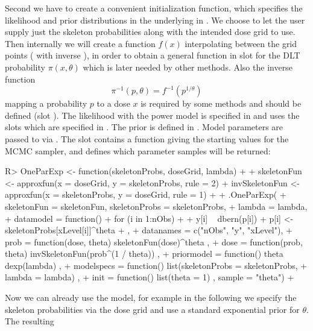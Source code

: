 \documentclass[article]{jss}\usepackage[]{graphicx}\usepackage[]{color}
\begin{document}
Second we have to create a convenient initialization function, which specifies
the likelihood and prior distributions in the underlying  in .
We choose to let the user supply just the skeleton probabilities along with the
intended dose grid to use. Then internally we will create a function $f(x)$ 
interpolating between the grid points ( with inverse ), in order to obtain a general  function
in slot  for the DLT probability $\pi(x, \theta)$ which is later needed by other methods. Also the inverse function 
\begin{equation}
\label{eq:oneparameterInverse}
\pi^{-1}(p, \theta) = f^{-1}(p^{1/\theta})
\end{equation}
mapping a probability $p$ to a dose $x$ is required by some methods and 
should be defined (slot ). The likelihood with the power model 
is specified in 
and uses the  slots which are specified in . The prior is 
defined in . Model parameters are passed to  via . The  slot contains a function giving the starting values for the MCMC sampler,
and  defines which parameter samples will be returned:
\begin{Schunk}
\begin{Sinput}
R> OneParExp <- function(skeletonProbs, doseGrid, lambda)
+  {
+    skeletonFun <- approxfun(x = doseGrid, y = skeletonProbs, rule = 2)
+    invSkeletonFun <- approxfun(x = skeletonProbs, y = doseGrid, rule = 1)
+    
+    .OneParExp(
+      skeletonFun = skeletonFun, skeletonProbs = skeletonProbs, 
+      lambda = lambda,
+      datamodel = function(){
+        for (i in 1:nObs)
+        {
+          y[i] ~ dbern(p[i])
+          p[i] <- skeletonProbs[xLevel[i]]^theta
+        }},
+      datanames = c("nObs", "y", "xLevel"),
+      prob = function(dose, theta){ skeletonFun(dose)^theta },
+      dose = function(prob, theta){ invSkeletonFun(prob^(1 / theta)) },
+      priormodel = function(){ theta ~ dexp(lambda) },
+      modelspecs = function(){ list(skeletonProbs = skeletonProbs,
+                                    lambda = lambda) },
+      init = function(){ list(theta = 1) }, sample = "theta")
+  }
\end{Sinput}
\end{Schunk}
Now we can already use the model, for example in the following we specify the skeleton probabilities via the dose grid and use a standard exponential prior for $\theta$. The resulting
\end{document}
